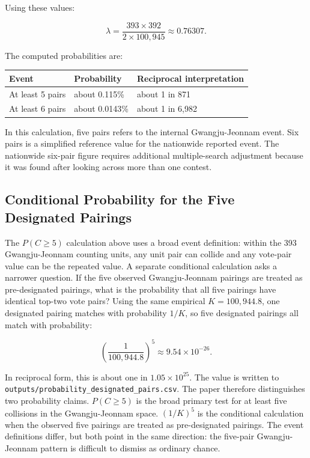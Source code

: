\documentclass[preprint]{../ieie/IEIE}
\begin{document}
Using these values:

\[
\lambda = \frac{393 \times 392}{2 \times 100,945} \approx 0.76307.
\]

The computed probabilities are:

\begin{center}
\small
\begin{tabular}{l l l}
\toprule
Event & Probability & Reciprocal interpretation \\
\midrule
At least 5 pairs & about 0.115\% & about 1 in 871 \\
At least 6 pairs & about 0.0143\% & about 1 in 6,982 \\
\bottomrule
\end{tabular}
\end{center}

In this calculation, five pairs refers to the internal Gwangju-Jeonnam event. Six pairs is a simplified reference value for the nationwide reported event. The nationwide six-pair figure requires additional multiple-search adjustment because it was found after looking across more than one contest.

\subsection{Conditional Probability for the Five Designated Pairings}

The \(P(C \geq 5)\) calculation above uses a broad event definition: within the 393 Gwangju-Jeonnam counting units, any unit pair can collide and any vote-pair value can be the repeated value. A separate conditional calculation asks a narrower question. If the five observed Gwangju-Jeonnam pairings are treated as pre-designated pairings, what is the probability that all five pairings have identical top-two vote pairs? Using the same empirical \(K=100,944.8\), one designated pairing matches with probability \(1/K\), so five designated pairings all match with probability:

\[
\left(\frac{1}{100,944.8}\right)^5 \approx 9.54 \times 10^{-26}.
\]

In reciprocal form, this is about one in \(1.05\times 10^{25}\). The value is written to \texttt{outputs/probability\_designated\_pairs.csv}. The paper therefore distinguishes two probability claims. \(P(C \geq 5)\) is the broad primary test for at least five collisions in the Gwangju-Jeonnam space. \((1/K)^5\) is the conditional calculation when the observed five pairings are treated as pre-designated pairings. The event definitions differ, but both point in the same direction: the five-pair Gwangju-Jeonnam pattern is difficult to dismiss as ordinary chance.
\end{document}
